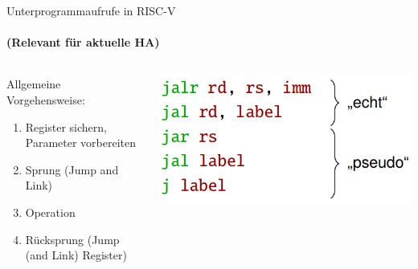 \documentclass[
  german,            %
  aspectratio=169,    %
]{tumbeamer}
\begin{document}
\begin{frame}[c]{Unterprogrammaufrufe in RISC-V}
  \framesubtitle{(Relevant für aktuelle HA)}
  \begin{columns}[c]
    \begin{column}{0.5\textwidth}
      Allgemeine Vorgehensweise:\\[.2cm] 
      \begin{enumerate}
        \item Register sichern, Parameter vorbereiten
        \item Sprung (Jump and Link)
        \item Operation
        \item Rücksprung (Jump (and Link) Register)
      \end{enumerate}
    \end{column}
    \begin{column}{0.4\textwidth}
      \includegraphics[width=\linewidth]{w03_jumpInstructionsWithPseudo_zue.png}
    \end{column}
  \end{columns}
\end{frame}
\end{document}
